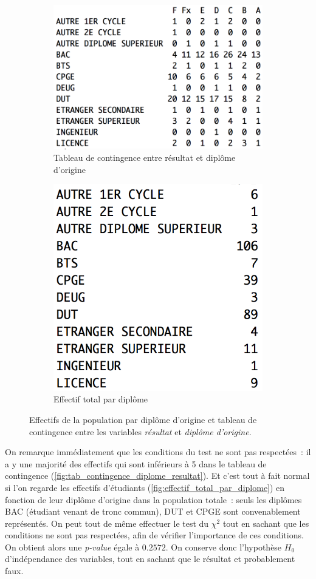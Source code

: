 \documentclass[a4paper,11pt]{report}
\begin{document}
\begin{figure}[H]
	\centering
	\captionsetup{justification=centering, margin=2cm}
	\begin{subfigure}[b]{0.5\linewidth}
		\centering
		\captionsetup{justification=centering, margin=1cm}
		\includegraphics[width=0.65\linewidth]{img/1-1-2-Contingence-Result-Diplome-Origine}
		\caption{\scriptsize Tableau de contingence entre résultat et diplôme d'origine}
		\label{fig:tab_contingence_diplome_resultat}
	\end{subfigure}%
	\begin{subfigure}[b]{0.5\linewidth}
		\centering
		\captionsetup{justification=centering, margin=1cm}
		\includegraphics[width=0.5\linewidth]{img/1-1-2-Effectif-Diplome-Origine}
		\caption{\scriptsize Effectif total par diplôme}
		\label{fig:effectif_total_par_diplome}
	\end{subfigure}%
	\caption{
		\small Effectifs de la population par diplôme d'origine et tableau de contingence entre les variables \textit{résultat} et \textit{diplôme d'origine}.
	}
	\label{fig:tab_effectifs_et_contingence_resultats_diplome_origine}%
\end{figure}

On remarque immédiatement que les conditions du test ne sont pas respectées~: il a y une majorité des effectifs qui sont inférieurs à 5 dans le tableau de contingence  (\autoref{fig:tab_contingence_diplome_resultat}). Et c'est tout à fait normal si l'on regarde les effectifs d'étudiants (\autoref{fig:effectif_total_par_diplome}) en fonction de leur diplôme d'origine dans la population totale~: seuls les diplômes BAC (étudiant venant de tronc commun), DUT et CPGE sont convenablement représentés.
On peut tout de même effectuer le test du $\chi^2$ tout en sachant que les conditions ne sont pas respectées, afin de vérifier l'importance de ces conditions. On obtient alors une \textit{p-value} égale à $0.2572$. On conserve donc l'hypothèse $H_{0}$ d'indépendance des variables, tout en sachant que le résultat et probablement faux.
\end{document}
